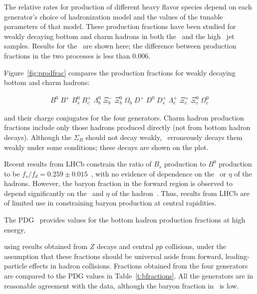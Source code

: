 
The relative rates for production of different heavy flavor species depend on each
generator's choice of hadronization model and the values of the tunable parameters of that model.
These production fractions have been studied for weakly decaying bottom and charm hadrons in both the \ttbar\
and the high \pT\ jet samples. Results for the \ttbar\ are shown here; the difference between
production fractions in the two processes is less than  0.006.

Figure~\ref{fig:prodfrac} compares the
production fractions for weakly decaying bottom and charm hadrons:

\begin{eqnarray*}
B^{0}\; B^{+}\; B_{s}^{0}\; B_{c}^{+}\; \Lambda_{b}^{0}\; \Xi_{b}^{-}\; \Xi_{b}^{0}\; \Omega_{b}\; D^{+}\; D^{0}\; D_{s}^{+}\; \Lambda_{c}^{+}\; \Xi_{c}^{+}\; \Xi_{c}^{0}\; \Omega_{c}^{0}
\end{eqnarray*} 

\noindent
and their charge conjugates for the four generators.
Charm hadron production fractions include only those hadrons produced directly (not from bottom hadron decays).
Although the $\Sigma_B$ should not decay weakly, 
\Herwig\ erroneously decays them weakly under some conditions; these decays are shown on the plot. 

Recent results from LHCb constrain the ratio of $B_s$ production to $B^0$ production to be
$f_s/f_d = 0.259 \pm 0.015$~\cite{lhcbfsfb}, with no evidence of dependence 
on the \pT\ or $\eta$ of the hadrons.
However, the baryon fraction in the forward region is observed to depend significantly on the  
\pT\ and $\eta$ of the hadron~\cite{lhcblam}.  Thus, results from LHCb are of limited use in
constraining baryon production at central rapidities. 

The PDG~\cite{PhysRevD.86.010001} provides values for the bottom hadron production fractions at high energy, 

using results obtained from  $Z$ decays and central $p\overline p $ collisions, under the
assumption that these fractions should be universal aside from forward, leading-particle effects
in hadron collisions.
Fractions obtained from the four generators are compared to the PDG values
in Table~\ref{t:bfractions}.
All the generators are in reasonable agreement with the data, although the baryon
fraction in  \PythiaE\ is low.  

